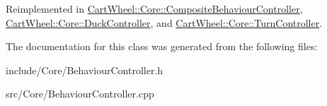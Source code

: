 Reimplemented in \hyperlink{classCartWheel_1_1Core_1_1CompositeBehaviourController_afaba80fe489ca6a997e33551d94a6db1}{CartWheel::Core::CompositeBehaviourController}, \hyperlink{classCartWheel_1_1Core_1_1DuckController_a4f3f53ac7bb338a04e8ee8c1152ca12c}{CartWheel::Core::DuckController}, and \hyperlink{classCartWheel_1_1Core_1_1TurnController_af0157d75af6f328d1241d8c12954128e}{CartWheel::Core::TurnController}.



The documentation for this class was generated from the following files:\begin{DoxyCompactItemize}
\item 
include/Core/BehaviourController.h\item 
src/Core/BehaviourController.cpp\end{DoxyCompactItemize}
